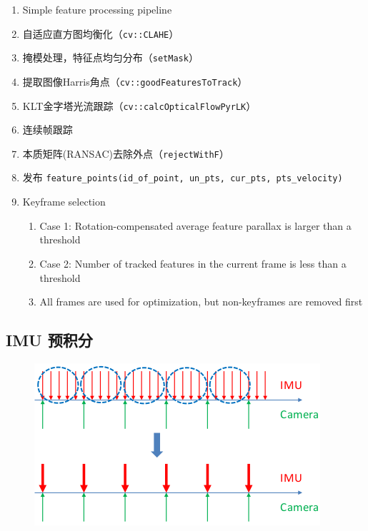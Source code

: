 \documentclass[12pt,a4paper]{article}
\begin{document}
\begin{enumerate}

  \item Simple feature processing pipeline
  \item 自适应直方图均衡化（\verb|cv::CLAHE|）
  \item 掩模处理，特征点均匀分布（\verb|setMask|）
  \item 提取图像Harris角点（\verb|cv::goodFeaturesToTrack|）
  \item KLT金字塔光流跟踪（\verb|cv::calcOpticalFlowPyrLK|）
  \item 连续帧跟踪
  \item 本质矩阵(RANSAC)去除外点（\verb|rejectWithF|）
  \item 发布 \verb|feature_points(id_of_point, un_pts, cur_pts, pts_velocity)|
  \item Keyframe selection
  
  \begin{enumerate}
  \item Case 1: Rotation-compensated average feature parallax is larger than a threshold
  \item Case 2: Number of tracked features in the current frame is less than a threshold
  \item All frames are used for optimization, but non-keyframes are removed first
  \end{enumerate}  
  
\end{enumerate}  

\subsection{IMU 预积分}

\begin{figure}[htbp]
\centering
\includegraphics[scale=0.6]{images/imu_integration_01.png}
\end{figure}
\end{document}
